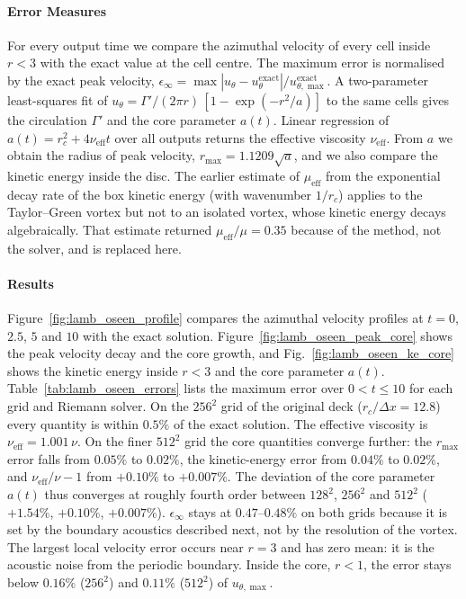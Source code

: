 \paragraph{Error Measures}
For every output time we compare the azimuthal velocity of every cell inside $r < 3$ with the exact value at the cell centre. The maximum error is normalised by the exact peak velocity, $\epsilon_\infty = \max|u_\theta - u_\theta^{\mathrm{exact}}| / u^{\mathrm{exact}}_{\theta,\max}$. A two-parameter least-squares fit of $u_\theta = \Gamma'/(2\pi r)\,[1 - \exp(-r^2/a)]$ to the same cells gives the circulation $\Gamma'$ and the core parameter $a(t)$. Linear regression of $a(t) = r_c^2 + 4\nu_{\mathrm{eff}} t$ over all outputs returns the effective viscosity $\nu_{\mathrm{eff}}$. From $a$ we obtain the radius of peak velocity, $r_{\max} = 1.1209\sqrt{a}$, and we also compare the kinetic energy inside the disc. The earlier estimate of $\mu_{\mathrm{eff}}$ from the exponential decay rate of the box kinetic energy (with wavenumber $1/r_c$) applies to the Taylor--Green vortex but not to an isolated vortex, whose kinetic energy decays algebraically. That estimate returned $\mu_{\mathrm{eff}}/\mu = 0.35$ because of the method, not the solver, and is replaced here.

\paragraph{Results}
Figure~\ref{fig:lamb_oseen_profile} compares the azimuthal velocity profiles at $t = 0$, $2.5$, $5$ and $10$ with the exact solution. Figure~\ref{fig:lamb_oseen_peak_core} shows the peak velocity decay and the core growth, and Fig.~\ref{fig:lamb_oseen_ke_core} shows the kinetic energy inside $r<3$ and the core parameter $a(t)$. Table~\ref{tab:lamb_oseen_errors} lists the maximum error over $0 < t \le 10$ for each grid and Riemann solver. On the $256^2$ grid of the original deck ($r_c/\Delta x = 12.8$) every quantity is within $0.5\%$ of the exact solution. The effective viscosity is $\nu_{\mathrm{eff}} = 1.001\,\nu$. On the finer $512^2$ grid the core quantities converge further: the $r_{\max}$ error falls from $0.05\%$ to $0.02\%$, the kinetic-energy error from $0.04\%$ to $0.02\%$, and $\nu_{\mathrm{eff}}/\nu - 1$ from $+0.10\%$ to $+0.007\%$. The deviation of the core parameter $a(t)$ thus converges at roughly fourth order between $128^2$, $256^2$ and $512^2$ ($+1.54\%$, $+0.10\%$, $+0.007\%$). $\epsilon_\infty$ stays at $0.47$--$0.48\%$ on both grids because it is set by the boundary acoustics described next, not by the resolution of the vortex.
The largest local velocity error occurs near $r = 3$ and has zero mean: it is the acoustic noise from the periodic boundary. Inside the core, $r < 1$, the error stays below $0.16\%$ ($256^2$) and $0.11\%$ ($512^2$) of $u_{\theta,\max}$.

